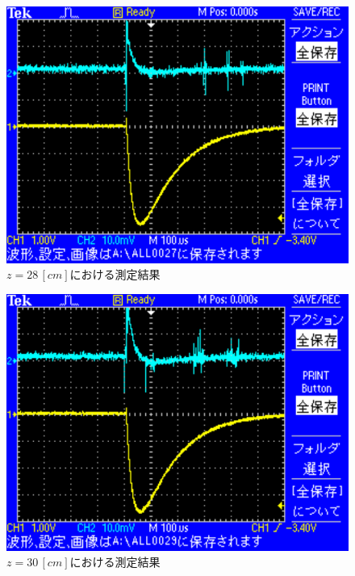 \begin{figure}[H]
    \centering
    \includegraphics[scale=0.5]{images-15.pdf}
    \caption{$z=28\,[cm]$における測定結果}
\end{figure}

\begin{figure}[H]
    \centering
    \includegraphics[scale=0.5]{images-16.pdf}
    \caption{$z=30\,[cm]$における測定結果}
\end{figure}

